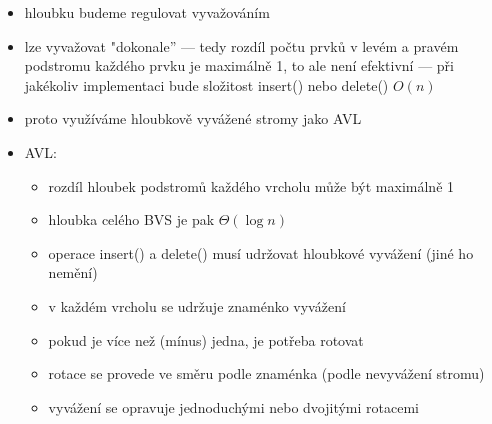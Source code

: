 \begin{itemize}
	\item hloubku budeme regulovat vyvažováním
	\item lze vyvažovat "dokonale'' --- tedy rozdíl počtu prvků v levém a pravém podstromu každého prvku je maximálně 1, to ale není efektivní --- při jakékoliv implementaci bude složitost insert() nebo delete() $O(n)$
	\item proto využíváme hloubkově vyvážené stromy jako AVL
	\item AVL:
	\begin{itemize}
		\item rozdíl hloubek podstromů každého vrcholu může být maximálně 1
		\item hloubka celého BVS je pak $\Theta (\log n)$
		\item operace insert() a delete() musí udržovat hloubkové vyvážení (jiné ho nemění)
		\item v každém vrcholu se udržuje znaménko vyvážení
		\item pokud je více  než (mínus) jedna, je potřeba rotovat
		\item rotace se provede ve směru podle znaménka (podle nevyvážení stromu)
		\item vyvážení se opravuje jednoduchými nebo dvojitými rotacemi
	\end{itemize}
\end{itemize}

